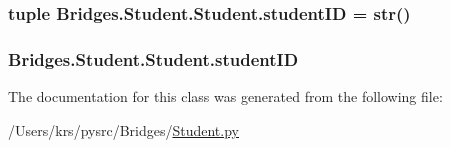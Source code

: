 \subsubsection[{student\+I\+D}]{\setlength{\rightskip}{0pt plus 5cm}tuple Bridges.\+Student.\+Student.\+student\+I\+D = str()\hspace{0.3cm}{\ttfamily [static]}}\label{class_bridges_1_1_student_1_1_student_a4eff3044b41f14dfa10f99433a9dc7e6}
\hypertarget{class_bridges_1_1_student_1_1_student_a2d819e6c57cca2531ceb07758f3c68ca}{}
\subsubsection[{student\+I\+D}]{\setlength{\rightskip}{0pt plus 5cm}Bridges.\+Student.\+Student.\+student\+I\+D}\label{class_bridges_1_1_student_1_1_student_a2d819e6c57cca2531ceb07758f3c68ca}


The documentation for this class was generated from the following file\+:\begin{DoxyCompactItemize}
\item 
/\+Users/krs/pysrc/\+Bridges/\hyperlink{_student_8py}{Student.\+py}\end{DoxyCompactItemize}
